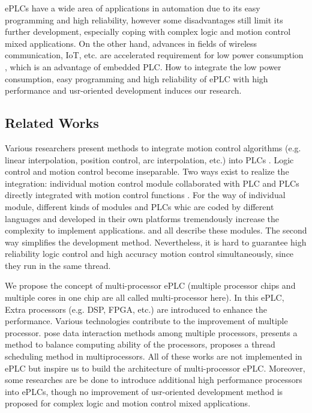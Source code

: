 \documentclass[journal,UTF8]{IEEEtran}
\begin{document}
ePLCs have a wide area of applications in automation due to its easy programming and high reliability, however some disadvantages \cite{Hossain2014Advanced} still limit its further development, especially coping with complex logic and motion control mixed applications. On the other hand, advances in fields of wireless communication, IoT, etc. are accelerated requirement for low power consumption \cite{Arshad2017Green}, which is an advantage of embedded PLC. How to integrate the low power consumption, easy programming and high reliability of ePLC with high performance and usr-oriented development induces our research.

\subsection{Related Works}
Various researchers present methods to integrate motion control algorithms (e.g. linear interpolation, position control, arc interpolation, etc.) into PLCs \cite{Ioannides2004Design,Shi2016The,Fang2017Design}. Logic control and motion control become inseparable. Two ways exist to realize the integration: individual motion control module collaborated with PLC \cite{Peng2011Linear} and PLCs directly integrated with motion control functions \cite{Ioannides2004Design,syaichu2011model}. For the way of individual module, different kinds of modules and PLCs whic are coded by different languages and developed in their own platforms tremendously increase the complexity to implement applications. \cite{Peng2011Linear,Qian2014A}  and \cite{Panasonic2011Programmable} all describe these modules. The second way simplifies the development method. Nevertheless, it is hard to guarantee high reliability logic control and high accuracy motion control simultaneously, since they run in the same thread. 

We propose the concept of multi-processor ePLC (multiple processor chips and multiple cores in one chip are all called multi-processor here). In this ePLC, Extra processors (e.g. DSP, FPGA, etc.) are introduced to enhance the performance. Various technologies contribute to the improvement of multiple processor. \cite{Dubois2002Memory,Patel2006Processor} pose data interaction methods among multiple processors, \cite{Zhu2016Providing} presents a method to balance computing ability of the processors, \cite{Albarakat2017MTB} proposes a thread scheduling method in multiprocessors. All of these works are not implemented in ePLC but inspire us to build the architecture of multi-processor ePLC. Moreover, some researches \cite{Hajduk2015Architecture, Chmiel2016An} are be done to introduce additional high performance processors into ePLCs, though no improvement of usr-oriented development method is proposed for complex logic and motion control mixed applications.
\end{document}
